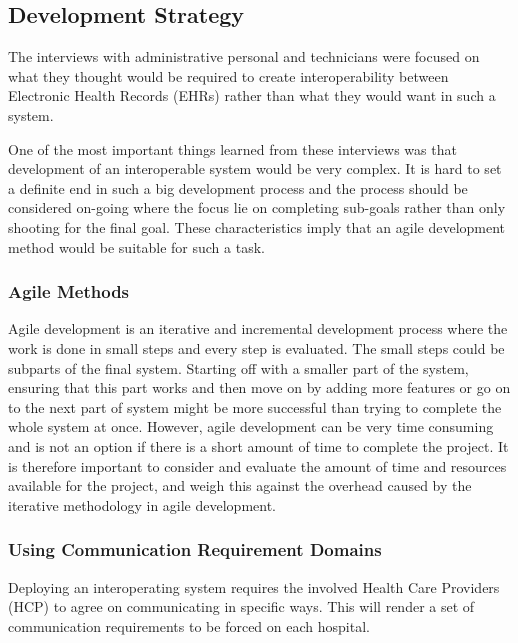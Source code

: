 \documentclass[14pt]{article}
\begin{document}
\subsection{Development Strategy}
The interviews with administrative personal and technicians were focused on what they thought would be required to create interoperability between Electronic Health Records (EHRs) rather than what they would want in such a system. 

One of the most important things learned from these interviews was that development of an interoperable system would be very complex. It is hard to set a definite end in such a big development process and the process should be considered on-going where the focus lie on completing sub-goals rather than only shooting for the final goal. These characteristics imply that an agile development method would be suitable for such a task.

\subsubsection{Agile Methods} %
Agile development is an iterative and incremental development process where the work is done in small steps and every step is evaluated. The small steps could be subparts of the final system. Starting off with a smaller part of the system, ensuring that this part works and then move on by adding more features or go on to the next part of system might be more successful than trying to complete the whole system at once. However, agile development can be very time consuming and is not an option if there is a short amount of time to complete the project. It is therefore important to consider and evaluate the amount of time and resources available for the project, and weigh this against the overhead caused by the iterative methodology in agile development.

\subsubsection{Using Communication Requirement Domains} %
Deploying an interoperating system requires the involved Health Care Providers (HCP) to agree on communicating in specific ways. This will render a set of communication requirements to be forced on each hospital. 
\end{document}
